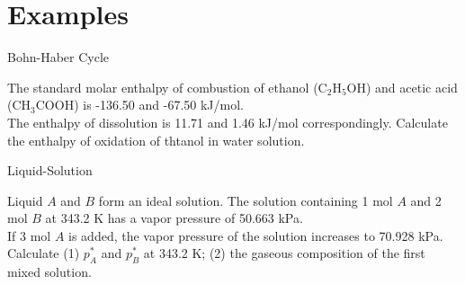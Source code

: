 \documentclass[12pt,compress]{beamer}
\begin{document}

\section{Examples}
\begin{frame}{Bohn-Haber Cycle}
    \begin{block}{}
        The standard molar enthalpy of combustion of ethanol (C$_2$H$_5$OH) and acetic acid (CH$_3$COOH) is -136.50 and -67.50 kJ/mol. \\
        The enthalpy of dissolution is 11.71 and 1.46 kJ/mol correspondingly. Calculate the enthalpy of oxidation of thtanol in water solution.
    \end{block}
\end{frame}
\begin{frame}{Liquid-Solution}
    \begin{block}{}
        Liquid $A$ and $B$ form an ideal solution. The solution containing 1 mol $A$ and 2 mol $B$ at 343.2 K has a vapor pressure of 50.663 kPa. \\
        If 3 mol $A$ is added, the vapor pressure of the solution increases to 70.928 kPa. Calculate (1) $p_A^*$ and $p_B^*$ at 343.2 K; (2) the gaseous composition of the first mixed solution.
    \end{block}
\end{frame}



\end{document}
